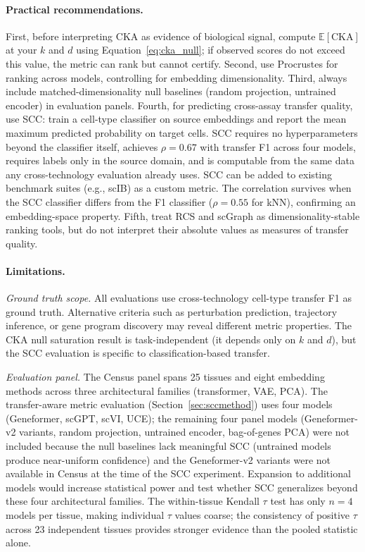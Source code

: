 \documentclass[11pt]{article}
\begin{document}
\paragraph{Practical recommendations.} First, before interpreting CKA as
evidence of biological signal, compute $\mathbb{E}[\mathrm{CKA}]$ at
your $k$ and $d$ using Equation~\ref{eq:cka_null}; if observed scores do
not exceed this value, the metric can rank but cannot certify. Second,
use Procrustes for ranking across models, controlling for
embedding dimensionality. Third, always include matched-dimensionality
null baselines (random projection, untrained encoder) in evaluation
panels. Fourth, for predicting cross-assay transfer quality, use SCC:
train a cell-type classifier on source embeddings and report the mean
maximum predicted probability on target cells. SCC requires no
hyperparameters beyond the classifier itself, achieves $\rho = 0.67$
with transfer F1 across four models, requires labels only in the
source domain, and is computable from the same data any
cross-technology evaluation already uses. SCC can be added to existing benchmark suites (e.g., scIB) as a
custom metric. The correlation survives
when the SCC classifier differs from the F1 classifier ($\rho = 0.55$
for kNN), confirming an embedding-space property. Fifth, treat RCS and scGraph
as dimensionality-stable ranking tools, but do not interpret their
absolute values as measures of transfer quality.

\paragraph{Limitations.}

\emph{Ground truth scope.} All evaluations use cross-technology
cell-type transfer F1 as ground truth. Alternative criteria such as
perturbation prediction, trajectory inference, or gene program
discovery may reveal different metric properties. The CKA null
saturation result is task-independent (it depends only on $k$ and $d$),
but the SCC evaluation is specific to classification-based transfer.

\emph{Evaluation panel.} The Census panel spans 25 tissues and eight
embedding methods across three architectural families (transformer, VAE,
PCA). The transfer-aware metric evaluation
(Section~\ref{sec:sccmethod}) uses four models (Geneformer, scGPT,
scVI, UCE); the remaining four panel models (Geneformer-v2 variants,
random projection, untrained encoder, bag-of-genes PCA) were not
included because the null baselines lack meaningful SCC (untrained
models produce near-uniform confidence) and the Geneformer-v2 variants
were not available in Census at the time of the SCC experiment.
Expansion to additional models would increase statistical power and
test whether SCC generalizes beyond these four architectural families.
The within-tissue Kendall $\tau$ test has only $n = 4$ models per
tissue, making individual $\tau$ values coarse; the consistency of
positive $\tau$ across 23 independent tissues provides stronger evidence
than the pooled statistic alone.
\end{document}
